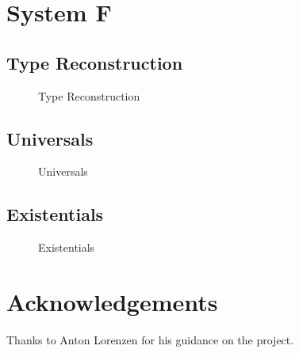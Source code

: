 \documentclass[nonacm]{acmart}
\begin{document}
\section{System F}

\subsection{Type Reconstruction}

\begin{figure}
  \begin{framed}
  \end{framed}
  \caption{Type Reconstruction}\label{fig:type-reconstruction}
\end{figure}

\subsection{Universals}

\begin{figure}
  \begin{framed}
  \end{framed}
  \caption{Universals}\label{fig:universals}
\end{figure}

\subsection{Existentials}

\begin{figure}
  \begin{framed}
  \end{framed}
  \caption{Existentials}\label{fig:existentials}
\end{figure}

\section{Acknowledgements}

Thanks to Anton Lorenzen for his guidance on the project.
\end{document}
